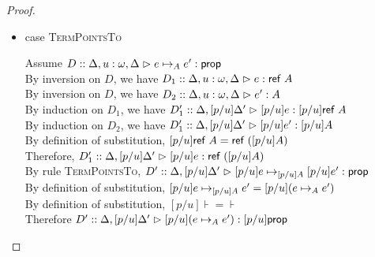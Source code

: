 \begin{proof}
\begin{enumerate}
\begin{itemize}
    \item case \textsc{TermPointsTo}
      \begin{tabbedproof}
        \oo Assume $D :: \judgeA[\Delta, u:\omega, \Delta]{e \pointsto_A e'}{\assert}$ \\
        \ooo By inversion on $D$, we have 
             $D_1 :: \judgeA[\Delta, u:\omega, \Delta]{e}{\reftype{A}}$ \\
        \ooo By inversion on $D$, we have 
             $D_2 :: \judgeA[\Delta, u:\omega, \Delta]{e'}{A}$ \\
        \ooo By induction on $D_1$, we have
             $D'_1 :: \judgeA[{\Delta, [p/u]\Delta'}]{[p/u]e}{[p/u]\reftype{A}}$ \\
        \ooo By induction on $D_2$, we have
             $D'_1 :: \judgeA[{\Delta, [p/u]\Delta'}]{[p/u]e'}{[p/u]A}$ \\
        \ooo By definition of substitution, $[p/u]\reftype{A} = \reftype{([p/u]A)}$ \\
        \ooo Therefore, 
             $D'_1 :: \judgeA[{\Delta, [p/u]\Delta'}]{[p/u]e}{\reftype{([p/u]A)}}$ \\
        \ooo By rule \textsc{TermPointsTo}, 
             $D' :: \judgeA[{\Delta, [p/u]\Delta'}]{[p/u]e \pointsto_{[p/u]A} [p/u]e'}{\assert}$ \\
        \ooo By definition of substitution, $[p/u]e \pointsto_{[p/u]A} e' = [p/u](e \pointsto_A e')$ \\
        \ooo By definition of substitution, $[p/u]\assert = \assert$ \\
        \ooo Therefore 
             $D' :: \judgeA[{\Delta, [p/u]\Delta'}]{[p/u](e \pointsto_A e')}{[p/u]\assert}$ \\
      \end{tabbedproof}


\end{itemize}
\end{enumerate}
\end{proof}
